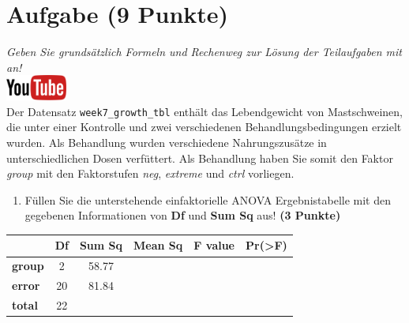 \documentclass[a4paper, 9pt]{scrartcl}\usepackage[]{graphicx}\usepackage[]{xcolor}
\begin{document}
\clearpage

\section{Aufgabe \hfill (9 Punkte)}

\textit{Geben Sie grunds{\"a}tzlich Formeln und Rechenweg zur L{\"o}sung der
  Teilaufgaben mit an!} \\[1Ex]

\hfill\href{https://youtu.be/IhecxMcCENY}{\includegraphics[width =
  2cm]{img/youtube}}\\[1Ex]




Der Datensatz \texttt{week7\_growth\_tbl} enth{\"a}lt das Lebendgewicht von
Mastschweinen, die unter einer Kontrolle und zwei verschiedenen
Behandlungsbedingungen erzielt wurden. Als Behandlung wurden verschiedene
Nahrungszus{\"a}tze in unterschiedlichen Dosen verf{\"u}ttert. Als Behandlung haben
Sie somit den Faktor \textit{group} mit den Faktorstufen
\textit{neg}, \textit{extreme} und
\textit{ctrl} vorliegen.



\begin{enumerate}
\item F{\"u}llen Sie die unterstehende einfaktorielle ANOVA Ergebnistabelle 
  mit den gegebenen Informationen von \textbf{Df} und \textbf{Sum Sq} aus!
  \textbf{(3 Punkte)}
\end{enumerate}

\vspace{1Ex}

\begin{center}
  \Large
  \begin{tabular}{l|c|c|c|c|c}
     & \textbf{Df} & \textbf{Sum Sq} & \textbf{Mean Sq} & \textbf{F value} & \textbf{Pr(>F)} \strut\\
    \hline
   \textbf{group}  & 2 & 58.77 &  &  &  \strut\\
    \hline
   \textbf{error}  & 20 & 81.84 &  &  &  \strut\\
        \hline
   \textbf{total}  & 22 &  &  &  &  \strut\\
  \end{tabular}
\end{center}
\end{document}
